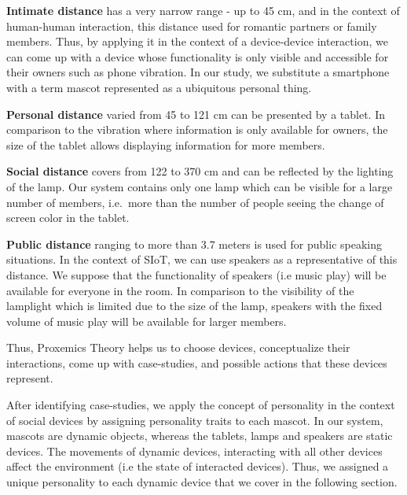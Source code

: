 \textbf{Intimate distance} has a very narrow range - up to 45 cm,
and in the context of human-human interaction, this distance used for romantic partners or family members.
Thus, by applying it in the context of a device-device interaction, we can come up with
a device whose functionality is only visible and accessible for their owners such as phone vibration.
In our study, we substitute a smartphone with a term mascot represented as a ubiquitous personal thing.

\textbf{Personal distance} varied from 45 to 121 cm can be presented by a tablet.
In comparison to the vibration where information is only available for owners,
the size of the tablet allows displaying information for more members.

\textbf{Social distance} covers from 122 to 370 cm and can be reflected by the lighting of the lamp.
Our system contains only one lamp which can be visible for a large number of members,
i.e.\ more than the number of people seeing the change of screen color in the tablet.

\textbf{Public distance} ranging to more than 3.7 meters is used for public speaking situations.
In the context of SIoT, we can use speakers as a representative of this distance.
We suppose that the functionality of speakers (i.e music play) will be available for everyone in the room.
In comparison to the visibility of the lamplight which is limited due to the size of the lamp,
speakers with the fixed volume of music play will be available for larger members.

Thus, Proxemics Theory helps us to choose devices, conceptualize their interactions,
come up with case-studies, and possible actions that these devices represent.

After identifying case-studies, we apply the concept of personality in the context of
social devices by assigning personality traits to each mascot.
In our system, mascots are dynamic objects, whereas the tablets, lamps and speakers are static devices.
The movements of dynamic devices, interacting with all other
devices affect the environment (i.e the state of interacted devices).
Thus, we assigned a unique personality to each dynamic device that we cover in the following section.

